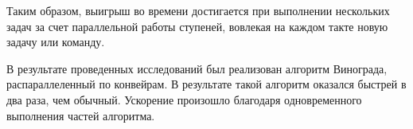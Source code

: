 \newpage
{}

Таким образом, выигрыш во времени достигается при выполнении нескольких задач за счет параллельной
работы ступеней, вовлекая на каждом такте новую задачу или команду.

В результате проведенных исследований был реализован алгоритм Винограда, распараллеленный
по конвейрам. В результате такой алгоритм оказался быстрей в два раза, чем обычный.
Ускорение произошло благодаря одновременного выполнения частей алгоритма.
